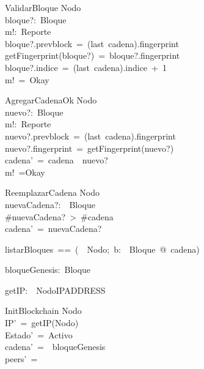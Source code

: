\begin{schema}{ValidarBloque}
\Xi Nodo\\
bloque?:~Bloque\\
m!:~Reporte\\
\where
bloque?.prevblock~=~(last~cadena).fingerprint\\
getFingerprint(bloque?)~=~bloque?.fingerprint\\
bloque?.indice~=~(last~cadena).indice~+~1\\
m!~=~Okay\\
\end{schema}
\begin{schema}{AgregarCadenaOk}
\Delta Nodo\\
nuevo?:~Bloque\\
m!:~Reporte\\
\where
nuevo?.prevblock~=~(last~cadena).fingerprint\\
nuevo?.fingerprint~=~getFingerprint(nuevo?)\\
cadena'~=~cadena~\cat~\langle nuevo?\rangle\\
m!~=Okay\\
\end{schema}
\begin{schema}{ReemplazarCadena}
\Delta Nodo\\
nuevaCadena?:~\seq~Bloque\\
\where
\#nuevaCadena?~>~\#cadena\\
cadena'~=~nuevaCadena?\\
\end{schema}
\begin{zed}
listarBloques~==~(~\lambda~Nodo;~b:~\seq~Bloque~@~cadena)\\
\end{zed}
\begin{axdef}
bloqueGenesis:~Bloque\\
\end{axdef}
\begin{axdef}
getIP:~\power~Nodo\fun IPADDRESS\\
\end{axdef}
\begin{schema}{InitBlockchain}
\Delta Nodo\\
\where
IP'~=~getIP(Nodo)\\
Estado'~=~Activo\\
cadena'~=~\langle~bloqueGenesis~\rangle\\
peers'~=~\emptyset\\
\end{schema}
